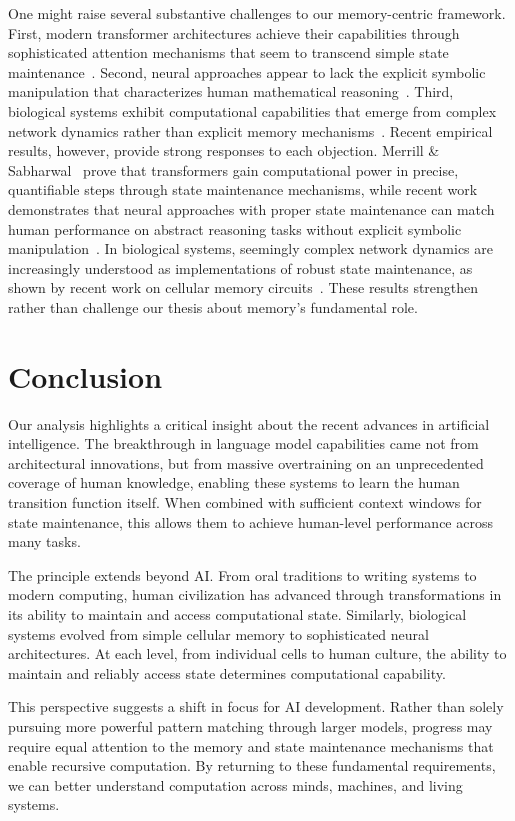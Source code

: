 \documentclass[12pt]{article}
\begin{document}
One might raise several substantive challenges to our memory-centric framework.
First, modern transformer architectures achieve their capabilities through sophisticated attention mechanisms that seem to transcend simple state maintenance~\cite{merrill2023parallelism}.
Second, neural approaches appear to lack the explicit symbolic manipulation that characterizes human mathematical reasoning~\cite{wei2022chain}.
Third, biological systems exhibit computational capabilities that emerge from complex network dynamics rather than explicit memory mechanisms~\cite{wang2023parallel}.
Recent empirical results, however, provide strong responses to each objection.
Merrill \& Sabharwal~\cite{merrill2024} prove that transformers gain computational power in precise, quantifiable steps through state maintenance mechanisms, while recent work demonstrates that neural approaches with proper state maintenance can match human performance on abstract reasoning tasks without explicit symbolic manipulation~\cite{qiu2024ask}.
In biological systems, seemingly complex network dynamics are increasingly understood as implementations of robust state maintenance, as shown by recent work on cellular memory circuits~\cite{espinosa2024molecular}.
These results strengthen rather than challenge our thesis about memory's fundamental role.

\section{Conclusion}

Our analysis highlights a critical insight about the recent advances in artificial intelligence.
The breakthrough in language model capabilities came not from architectural innovations, but from massive overtraining on an unprecedented coverage of human knowledge, enabling these systems to learn the human transition function itself.
When combined with sufficient context windows for state maintenance, this allows them to achieve human-level performance across many tasks.

The principle extends beyond AI.
From oral traditions to writing systems to modern computing, human civilization has advanced through transformations in its ability to maintain and access computational state.
Similarly, biological systems evolved from simple cellular memory to sophisticated neural architectures.
At each level, from individual cells to human culture, the ability to maintain and reliably access state determines computational capability.

This perspective suggests a shift in focus for AI development.
Rather than solely pursuing more powerful pattern matching through larger models, progress may require equal attention to the memory and state maintenance mechanisms that enable recursive computation.
By returning to these fundamental requirements, we can better understand computation across minds, machines, and living systems.

\begingroup
\footnotesize


\endgroup
\end{document}
